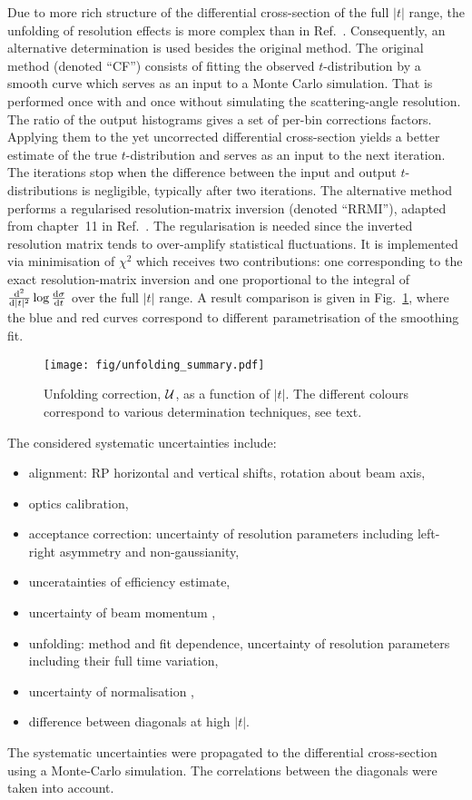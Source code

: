 \documentclass[doublecol]{epl/epl2}
\def\d{{\rm d}}
\begin{document}
Due to more rich structure of the differential cross-section of the full $|t|$ range, the unfolding of resolution effects is more complex than in Ref.~\cite{totem-8tev-90m}. Consequently, an alternative determination is used besides the original method. The original method (denoted ``CF'') consists of fitting the observed $t$-distribution by a smooth curve which serves as an input to a Monte Carlo simulation. That is performed once with and once without simulating the scattering-angle resolution. The ratio of the output histograms gives a set of per-bin corrections factors. Applying them to the yet uncorrected differential cross-section yields a better estimate of the true $t$-distribution and serves as an input to the next iteration. The iterations stop when the difference between the input and output $t$-distributions is negligible, typically after two iterations. The alternative method performs a regularised resolution-matrix inversion (denoted ``RRMI''), adapted from chapter~11 in Ref.~\cite{Cowan2002}. The regularisation is needed since the inverted resolution matrix tends to over-amplify statistical fluctuations. It is implemented via minimisation of $\chi^2$ which receives two contributions: one corresponding to the exact resolution-matrix inversion and one proportional to the integral of ${\d^2\over \d |t|^2} \log {\d\sigma\over \d t}$ over the full $|t|$ range. A result comparison is given in Fig.~\ref{f:unfolding}, where the blue and red curves correspond to different parametrisation of the smoothing fit.

\begin{figure}
\begin{center}
\texttt{[image: fig/unfolding\_summary.pdf]}
\vskip-5mm
\caption{Unfolding correction, ${\cal U}$, as a function of $|t|$. The different colours correspond to various determination techniques, see text.}
\label{f:unfolding}
\end{center}
\end{figure}

The considered systematic uncertainties include:
\begin{itemize}[topsep=0pt,itemsep=-2pt]
\item alignment: RP horizontal and vertical shifts, rotation about beam axis,
\item optics calibration,
\item acceptance correction: uncertainty of resolution parameters including left-right asymmetry and non-gaussianity,
\item unceratainties of efficiency estimate,
\item uncertainty of beam momentum \cite{beam-mom-unc},
\item unfolding: method and fit dependence, uncertainty of resolution parameters including their full time variation,
\item uncertainty of normalisation \cite{totem-8tev-tot1},
\item difference between diagonals at high $|t|$.
\end{itemize}
The systematic uncertainties were propagated to the differential cross-section using a Monte-Carlo simulation. The correlations between the diagonals were taken into account. %
\end{document}
